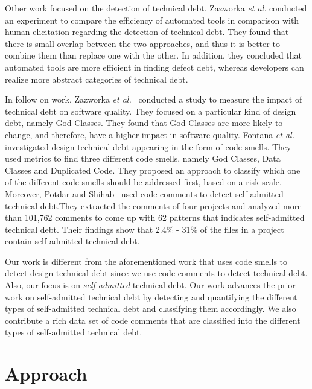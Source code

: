 Other work focused on the detection of technical debt. Zazworka \textit{et al.} \cite{Zazworka2013CSE} conducted an experiment to compare the efficiency of automated tools in comparison with human elicitation regarding the detection of technical debt. They found that there is small overlap between the two approaches, and thus it is better to combine them than replace one with the other. In addition, they concluded that automated tools are more efficient in finding defect debt, whereas developers can realize more abstract categories of technical debt.

In follow on work, Zazworka \textit{et al.}~\cite{Zazworka2011MTD} conducted a study to measure the impact of technical debt on software quality. They focused on a particular kind of design debt, namely God Classes. They found that God Classes are more likely to change, and therefore, have a higher impact in software quality. Fontana \textit{et al.}~\cite{Fontana2012MTD} investigated design technical debt appearing in the form of code smells. They used metrics to find three different code smells, namely God Classes, Data Classes and Duplicated Code. They proposed an approach to classify which one of the different code smells should be addressed first, based on a risk scale. Moreover, Potdar and Shihab~\cite{Potdar2014ICSME} used code comments to detect self-admitted technical debt.They extracted the comments of four projects and analyzed more than 101,762 comments to come up with 62 patterns that indicates self-admitted technical debt. Their findings show that 2.4\% - 31\% of the files in a project contain self-admitted technical debt.

Our work is different from the aforementioned work that uses code smells to detect design technical debt since we use code comments to detect technical debt. Also, our focus is on \emph{self-admitted} technical debt. Our work advances the prior work on self-admitted technical debt by detecting and quantifying the different types of self-admitted technical debt and classifying them accordingly. We also contribute a rich data set of code comments that are classified into the different types of self-admitted technical debt.

\section{Approach}
\label{chap3:sec:approach}

